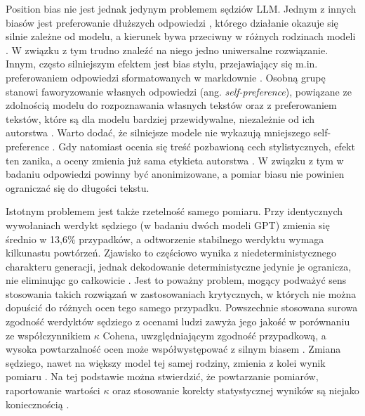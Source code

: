 \documentclass[11pt,a4paper]{article}
\begin{document}
Position bias nie jest jednak jedynym problemem sędziów LLM. Jednym z innych biasów jest preferowanie dłuższych odpowiedzi \cite{zhengetal2023c,parketal2024a}, którego działanie okazuje się silnie zależne od modelu, a kierunek bywa przeciwny w różnych rodzinach modeli \cite{soumik2026}. W związku z tym trudno znaleźć na niego jedno uniwersalne rozwiązanie. Innym, często silniejszym efektem jest bias stylu, przejawiający się m.in. preferowaniem odpowiedzi sformatowanych w markdownie \cite{soumik2026}. Osobną grupę stanowi faworyzowanie własnych odpowiedzi (ang. \emph{self-preference}), powiązane ze zdolnością modelu do rozpoznawania własnych tekstów \cite{panicksseryetal2024b} oraz z preferowaniem tekstów, które są dla modelu bardziej przewidywalne, niezależnie od ich autorstwa \cite{wataokaetal2025}. Warto dodać, że silniejsze modele nie wykazują mniejszego self-preference \cite{yangetal2026a}. Gdy natomiast ocenia się treść pozbawioną cech stylistycznych, efekt ten zanika, a oceny zmienia już sama etykieta autorstwa \cite{chaeetal2026a}. W związku z tym w badaniu odpowiedzi powinny być anonimizowane, a pomiar biasu nie powinien ograniczać się do długości tekstu.

Istotnym problemem jest także rzetelność samego pomiaru. Przy identycznych wywołaniach werdykt sędziego (w badaniu dwóch modeli GPT) zmienia się średnio w 13,6\% przypadków, a odtworzenie stabilnego werdyktu wymaga kilkunastu powtórzeń. Zjawisko to częściowo wynika z niedeterministycznego charakteru generacji, jednak dekodowanie deterministyczne jedynie je ogranicza, nie eliminując go całkowicie \cite{yagubyan2026}. Jest to poważny problem, mogący podważyć sens stosowania takich rozwiązań w zastosowaniach krytycznych, w których nie można dopuścić do różnych ocen tego samego przypadku. Powszechnie stosowana surowa zgodność werdyktów sędziego z ocenami ludzi zawyża jego jakość w porównaniu ze współczynnikiem $\kappa$ Cohena, uwzględniającym zgodność przypadkową, a wysoka powtarzalność ocen może współwystępować z silnym biasem \cite{normanetal2026}. Zmiana sędziego, nawet na większy model tej samej rodziny, zmienia z kolei wynik pomiaru \cite{yangetal2026}. Na tej podstawie można stwierdzić, że powtarzanie pomiarów, raportowanie wartości $\kappa$ oraz stosowanie korekty statystycznej wyników są niejako koniecznością \cite{lee2026how}.
\end{document}
